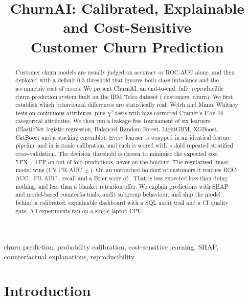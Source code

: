 \documentclass[conference]{IEEEtran}
\title{ChurnAI: Calibrated, Explainable and Cost-Sensitive\\ Customer Churn Prediction}
\author{\IEEEauthorblockN{Krish Kamra}
\IEEEauthorblockA{Independent Researcher\\
\url{https://github.com/KrishKamra/Customer_Churn_Prediction}}}
\begin{document}
\maketitle

\begin{abstract}
Customer churn models are usually judged on accuracy or ROC-AUC alone, and then deployed with a
default 0.5 threshold that ignores both class imbalance and the asymmetric cost of errors. We
present ChurnAI, an end-to-end, fully reproducible churn-prediction system built on the IBM Telco
dataset (\NCustomers{} customers, \ChurnRate{} churn). We first establish which behavioural
differences are statistically real: Welch and Mann--Whitney tests on continuous attributes, plus
$\chi^2$ tests with bias-corrected Cram\'er's $V$ on 16 categorical attributes. We then run a
leakage-free tournament of six learners (ElasticNet logistic regression, Balanced Random Forest,
LightGBM, XGBoost, CatBoost and a stacking ensemble). Every learner is wrapped in an identical
feature pipeline and in isotonic calibration, and each is scored with
\CVRepeats{}$\times$\CVFolds{}-fold repeated stratified cross-validation. The decision threshold
is chosen to minimise the expected cost $5\,\mathrm{FN}+1\,\mathrm{FP}$ on out-of-fold
predictions, never on the holdout. The regularised linear model wins (CV PR-AUC
\CVPR{}\,$\pm$\,\CVPRsd{}). On an untouched holdout of \NHoldout{} customers it reaches ROC-AUC
\HoldoutROC{}, PR-AUC \HoldoutPR{}, recall \HoldoutRecall{} and a Brier score of
\HoldoutBrier{}. That is \LossSavingNone{} less expected loss than doing nothing, and
\LossSavingAll{} less than a blanket retention offer. We explain predictions with SHAP and
model-based counterfactuals, audit subgroup behaviour, and ship the model behind a calibrated,
explainable dashboard with a SQL audit trail and a CI quality gate. All experiments ran on a
single laptop CPU.
\end{abstract}

\begin{IEEEkeywords}
churn prediction, probability calibration, cost-sensitive learning, SHAP, counterfactual
explanations, reproducibility
\end{IEEEkeywords}

\section{Introduction}
\label{sec:intro}
\end{document}
